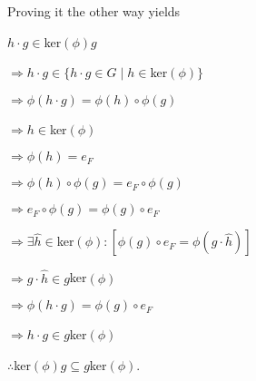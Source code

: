 \documentclass[12pt, a4paper]{article}
\begin{document}
\newpage

\begin{flushleft}

    Proving it the other way yields

\end{flushleft}

\hspace{2mm} $h\cdot g\in$ker$(\phi)g$\par
\vspace{2mm}
\hspace{10mm} $\Rightarrow h\cdot g\in\{h\cdot g\in G\mid h\in$ker$(\phi)\}$\par
\vspace{2mm}
\hspace{10mm} $\Rightarrow\phi(h\cdot g)=\phi(h)\circ\phi(g)$\par
\vspace{2mm}
\hspace{10mm} $\Rightarrow h\in$ker$(\phi)$\par
\vspace{2mm}
\hspace{10mm} $\Rightarrow\phi(h)=e_F$\par
\vspace{2mm}
\hspace{10mm} $\Rightarrow\phi(h)\circ\phi(g)=e_F\circ\phi(g)$\par
\vspace{2mm}
\hspace{10mm} $\Rightarrow e_F\circ\phi(g)=\phi(g)\circ e_F$\par
\vspace{2mm} 
\hspace{10mm} $\Rightarrow\exists\hat{h}\in$ker$(\phi)\colon[\phi(g)\circ e_F=\phi(g\cdot\hat{h})]$\par
\vspace{2mm}
\hspace{10mm} $\Rightarrow g\cdot\hat{h}\in g$ker$(\phi)$\par
\vspace{2mm}
\hspace{10mm} $\Rightarrow\phi(h\cdot g)=\phi(g)\circ e_F$\par
\vspace{2mm}
\hspace{10mm} $\Rightarrow h\cdot g\in g$ker$(\phi)$\par
\vspace{2mm}
\hspace{2mm} $\therefore $ker$(\phi)g\subseteq g$ker$(\phi)$.
\end{document}
